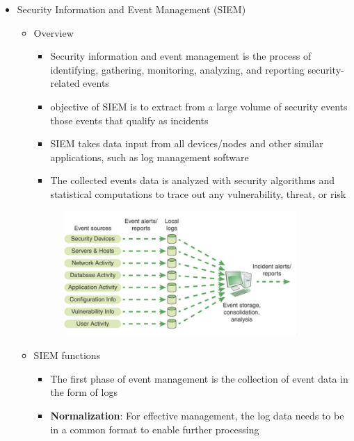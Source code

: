 \documentclass{article}
\begin{document}
\begin{itemize}
\begin{itemize}
\begin{itemize}
\begin{itemize}
            \end{itemize}
        \end{itemize}
    \end{itemize}
    \item Security Information and Event Management (SIEM)
    \begin{itemize}
        \item Overview
        \begin{itemize}
            \item Security information and event management is the process of identifying, gathering, monitoring, analyzing, and reporting security-related events
            \item objective of SIEM is to extract from a large volume of security events those events that qualify as incidents
            \item SIEM takes data input from all devices/nodes and other similar applications, such as log management software
            \item The collected events data is analyzed with security algorithms and statistical computations to trace out any vulnerability, threat, or risk
        \end{itemize}
        \begin{figure}[h]
            \centering
            \includegraphics[width=0.90\textwidth]{figure/SIEM.png}
        \end{figure}
        \item SIEM functions
        \begin{itemize}
            \item The first phase of event management is the collection of event data in the form of logs
            \item \textbf{Normalization}: For effective management, the log data needs to be in a common format to enable further processing

\end{itemize}
\end{itemize}
\end{itemize}
\end{document}
